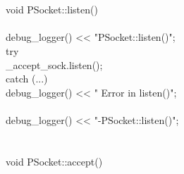 \documentclass{article}
\begin{document}
\\
 
\\
 void PSocket::listen()
\\
 {
\\
     debug_logger() << "PSocket::listen()\n";
\\
     try {
\\
                 _accept_sock.listen();
\\
     } catch (...) {
\\
         debug_logger() << "    Error in listen()\n";        
\\
     }
\\
     debug_logger() << "-PSocket::listen()\n";    
\\
 }
\\
 
\\
 void PSocket::accept()
\\
\end{document}
